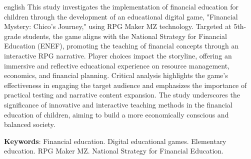 
\begin{resumo}[Abstract]
	\begin{otherlanguage*}{english}
		This study investigates the implementation of financial education for children through the development of an educational digital game, "Financial Mystery: Chico's Journey," using RPG Maker MZ technology. Targeted at 5th-grade students, the game aligns with the National Strategy for Financial Education (ENEF), promoting the teaching of financial concepts through an interactive RPG narrative. Player choices impact the storyline, offering an immersive and reflective educational experience on resource management, economics, and financial planning. Critical analysis highlights the game's effectiveness in engaging the target audience and emphasizes the importance of practical testing and narrative content expansion. The study underscores the significance of innovative and interactive teaching methods in the financial education of children, aiming to build a more economically conscious and balanced society.

		\textbf{Keywords}: Financial education. Digital educational games. Elementary education. RPG Maker MZ. National Strategy for Financial Education.
	\end{otherlanguage*}
\end{resumo}
